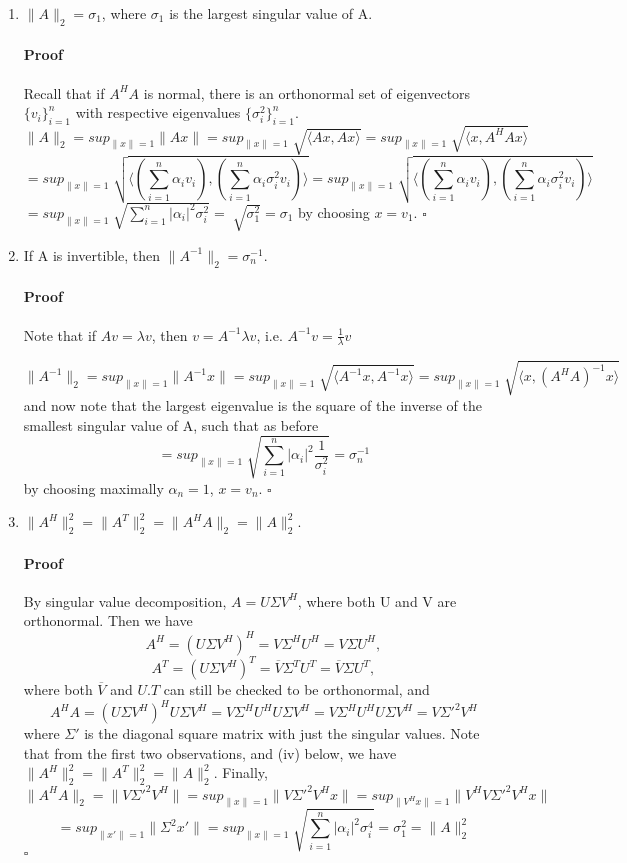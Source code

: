 \documentclass[letterpaper,12pt]{article}
\theoremstyle{definition}
\begin{document}
\begin{enumerate}[label=(\roman*)]
\item $\|A\|_2 = \sigma_1$, where $\sigma_1$ is the largest singular value of A.

\paragraph{Proof} Recall that if $A^HA$ is normal, there is an orthonormal set of eigenvectors $\{v_i\}_{i = 1}^n$ with respective eigenvalues $\{\sigma_i^2\}_{i = 1}^n$. 
$$\|A\|_2 = sup_{\|x\| = 1} \| Ax\| = sup_{\|x\| = 1} \sqrt[]{\langle Ax, Ax \rangle } 
= sup_{\|x\| = 1} \sqrt[]{\langle x, A^HAx \rangle} $$
$$
= sup_{\|x\| = 1} \sqrt[]{\langle (\sum_{i = 1}^n \alpha_i v_i), (\sum_{i = 1}^n \alpha_i \sigma_i^2 v_i) \rangle}
= sup_{\|x\| = 1} \sqrt[]{\langle (\sum_{i = 1}^n \alpha_i v_i), (\sum_{i = 1}^n \alpha_i \sigma_i^2 v_i) \rangle}$$
$= sup_{\|x\| = 1} \sqrt[]{\sum_{i = 1}^n |\alpha_i|^2 \sigma_i^2 } 
= \sqrt[]{ \sigma_1^2 } = \sigma_1$ by choosing $x =  v_1$.  $\square$


\item If A is invertible, then $\|A^{-1}\|_2 =  \sigma_n^{-1}.$

\paragraph{Proof} Note that if $A v = \lambda v$, then $ v = A^{-1} \lambda v$, i.e. $A^{-1} v = \frac{1}{\lambda} v$

$$\|A^{-1}\|_2 = sup_{\|x\| = 1} \| A^{-1}x\| = sup_{\|x\| = 1} \sqrt[]{\langle A^{-1}x, A^{-1}x \rangle } 
= sup_{\|x\| = 1} \sqrt[]{\langle x, (A^HA)^{-1}x \rangle} $$
and now note that the largest eigenvalue is the square of the inverse of the smallest singular value of A, such that as before 
$$ = sup_{\|x\| = 1} \sqrt[]{\sum_{i = 1}^n |\alpha_i|^2 \frac{1}{\sigma_i^2}} 
 = \sigma_n^{-1}$$ by choosing maximally $\alpha_n = 1$, $x =  v_n$.
$\square$

\item $\|A^{H}\|_2^2 =  \|A^{T}\|_2^2 = \|A^{H}A\|_2 = \|A\|_2^2.$


\paragraph{Proof} By singular value decomposition, $A = U \Sigma V^H$, where both U and V are orthonormal. Then we have
$$A^H = (U \Sigma V^H)^H 
= V \Sigma^H U^H 
= V \Sigma U^H,$$ 
$$A^T = (U \Sigma V^H)^T 
= \overline{V} \Sigma^T U^T
= \overline{V} \Sigma U^T,$$ where both $\overline{V}$ and $U.T$ can still be checked to be orthonormal,
and 
$$A^HA 
= (U \Sigma V^H)^H U \Sigma V^H 
= V \Sigma^H U^H U \Sigma V^H
= V \Sigma^H U^H U \Sigma V^H
= V \Sigma'^2 V^H$$
where $\Sigma'$ is the diagonal square matrix with just the singular values.
Note that from the first two observations, and (iv) below, we have $\|A^{H}\|_2^2 =  \|A^{T}\|_2^2 = \|A\|_2^2.$
Finally,
$$\|A^{H}A\|_2 = \|V \Sigma'^2 V^H\| 
= sup_{\|x\| = 1} \|V \Sigma'^2 V^H x\| 
= sup_{\|V^H x\| = 1} \| V^H V \Sigma'^2 V^H x\|$$
$$
= sup_{\|x'\| = 1} \| \Sigma^2 x'\| 
= sup_{\|x\| = 1} \sqrt[]{\sum_{i = 1}^n |\alpha_i|^2 \sigma_i^4 } = \sigma_1^2  = \|A\|_2^2$$
$\square$


\end{enumerate}
\end{document}
